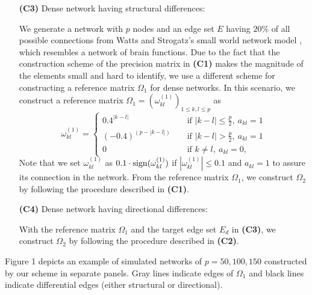 \documentclass[useAMS,usenatbib,referee]{bio}
\begin{document}
{{\begin{itemize}
In this scenario, we use the same reference matrix $\Omega_1$ and the target edge set $E_d$ in {\bf (C1)}.
To make directional differences between $\Omega_1$ and $\Omega_2$,
we define a matrix $\Omega_2 = (\omega^{(2)}_{kl})_{1 \le k,l \le p}$  as $\omega^{(2)}_{kl} = \omega^{(1)}_{kl}$ if $(k,l) \in E\setminus E_d$, $\omega^{(2)}_{kl} =  -\omega^{(1)}_{kl}$ if $(k,l) \in E_d$, and $\omega^{(2)}_{kl} = 0$ otherwise, where
$E$ is the edge set of the reference network $\Omega_1$. 


\item[{\bf (C3)}] Dense network having structural differences:

We generate a network with $p$ nodes and an edge set $E$ having $20\%$ of all possible connections from Watts and Strogatz's small world network model \citep{Watts:1998}, which resembles a network of brain functions.
Due to the fact that the construction scheme of the precision matrix in {\bf (C1)}
makes the magnitude of the elements small and hard to identify,
we use a different scheme for constructing a reference matrix $\Omega_1$ for dense networks.
In this scenario, we construct a reference matrix 
$\Omega_1 = (\omega^{(1)}_{kl})_{1\le k,l \le p}$
as \begin{equation} \nonumber
\omega^{(1)}_{kl} = \left\{ \begin{array}{lll}
0.4^{|k-l|} & & \mbox{ if } |k-l|\le \frac{p}{2},~ a_{kl}=1\\
(-0.4)^{(p-|k-l|)}& &  \mbox{ if } |k-l| > \frac{p}{2},~ a_{kl}=1\\
0 & & \mbox{ if } k \neq l, ~a_{kl}=0,
\end{array}
\right.
\end{equation}
Note that we set $\omega^{(1)}_{kl}$ as $0.1 \cdot {\rm sign}(\omega^{(1)}_{kl})$
if $|\omega^{(1)}_{kl}| \le 0.1$ and $a_{kl}=1$ to assure its connection in the network. 
From the reference matrix $\Omega_1$, we construct $\Omega_2$ by following the procedure described in {\bf (C1)}.

 
\item[{\bf (C4)}] Dense network having directional differences:

With the  reference matrix $\Omega_1$ and the target edge set $E_d$ in {\bf (C3)}, we construct $\Omega_2$ by following the procedure described in {\bf (C2)}.

\end{itemize}

\noindent Figure 1 depicts an example of simulated networks of $p=50, 100, 150$ constructed by our scheme in separate panels. Gray lines indicate edges of $\Omega_1$ and black lines indicate differential edges (either structural or directional).

}}
\end{document}
